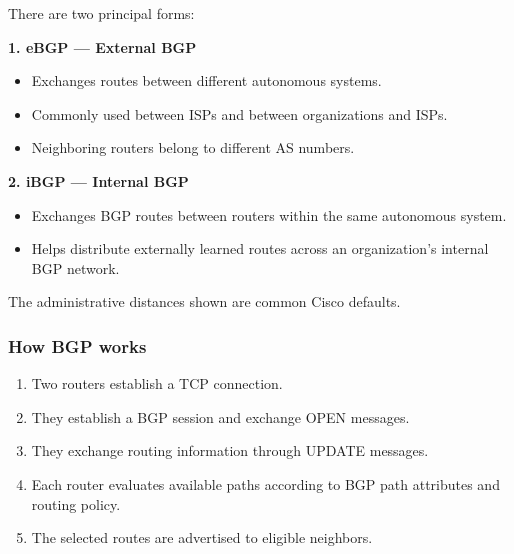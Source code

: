 There are two principal forms:

\textbf{1. eBGP --- External BGP}

\begin{itemize}
\item Exchanges routes between different autonomous systems.
\item Commonly used between ISPs and between organizations and ISPs.
\item Neighboring routers belong to different AS numbers.
\end{itemize}

\textbf{2. iBGP --- Internal BGP}

\begin{itemize}
\item Exchanges BGP routes between routers within the same autonomous system.
\item Helps distribute externally learned routes across an organization's internal BGP network.
\end{itemize}


The administrative distances shown are common Cisco defaults.

\subsubsection{How BGP works}

\begin{enumerate}
\item Two routers establish a TCP connection.
\item They establish a BGP session and exchange OPEN messages.
\item They exchange routing information through UPDATE messages.
\item Each router evaluates available paths according to BGP path attributes and routing policy.
\item The selected routes are advertised to eligible neighbors.
\end{enumerate}

